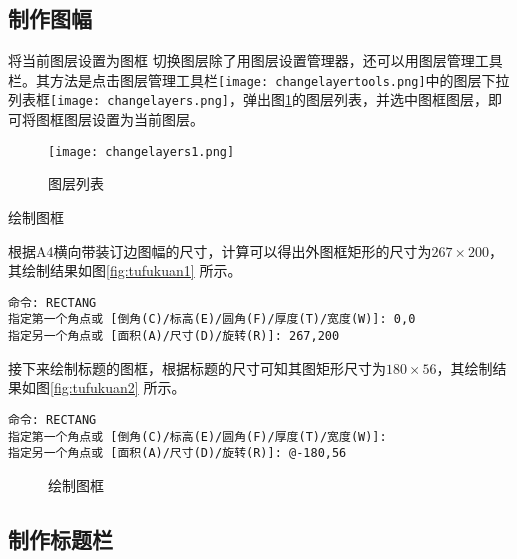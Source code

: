 \subsection{制作图幅}
\begin{procedure}
\item 将当前图层设置为图框
切换图层除了用图层设置管理器，还可以用图层管理工具栏。其方法是点击图层管理工具栏\texttt{[image: changelayertools.png]}中的图层下拉列表框\texttt{[image: changelayers.png]}，弹出图\ref{fig:changelayers1}的图层列表，并选中图框图层，即可将图框图层设置为当前图层。
\begin{figure}[htbp]
\centering
\texttt{[image: changelayers1.png]}
\caption{图层列表}\label{fig:changelayers1}
\end{figure}
\item 绘制图框

根据A4横向带装订边图幅的尺寸，计算可以得出外图框矩形的尺寸为$267\times 200$，其绘制结果如图\ref{fig:tufukuan1} 所示。
\begin{lstlisting}
命令: RECTANG
指定第一个角点或 [倒角(C)/标高(E)/圆角(F)/厚度(T)/宽度(W)]: 0,0
指定另一个角点或 [面积(A)/尺寸(D)/旋转(R)]: 267,200
\end{lstlisting}

接下来绘制标题的图框，根据标题的尺寸可知其图矩形尺寸为$180\times 56$，其绘制结果如图\ref{fig:tufukuan2} 所示。
\begin{lstlisting}
命令: RECTANG
指定第一个角点或 [倒角(C)/标高(E)/圆角(F)/厚度(T)/宽度(W)]:
指定另一个角点或 [面积(A)/尺寸(D)/旋转(R)]: @-180,56
\end{lstlisting}
\begin{figure}[htbp]
\hspace{20pt}
\caption{绘制图框}
\end{figure}
\end{procedure}
\subsection{制作标题栏}

